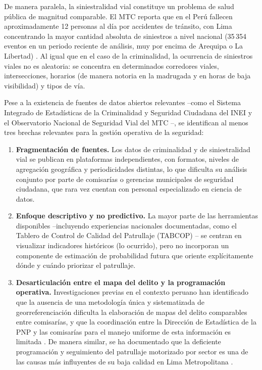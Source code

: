 \documentclass[12pt,letterpaper]{report}
\begin{document}
De manera paralela, la siniestralidad vial constituye un problema de salud p\'ublica de magnitud comparable. El MTC reporta que en el Per\'u fallecen aproximadamente 12 personas al d\'ia por accidentes de tr\'ansito, con Lima concentrando la mayor cantidad absoluta de siniestros a nivel nacional (35\,354 eventos en un periodo reciente de an\'alisis, muy por encima de Arequipa o La Libertad) \citep{mtc2024observatorio}. Al igual que en el caso de la criminalidad, la ocurrencia de siniestros viales no es aleatoria: se concentra en determinados corredores viales, intersecciones, horarios (de manera notoria en la madrugada y en horas de baja visibilidad) y tipos de v\'ia.

Pese a la existencia de fuentes de datos abiertos relevantes --como el Sistema Integrado de Estad\'isticas de la Criminalidad y Seguridad Ciudadana del INEI \citep{inei2022sistema} y el Observatorio Nacional de Seguridad Vial del MTC \citep{mtc2024observatorio}--, se identifican al menos tres brechas relevantes para la gesti\'on operativa de la seguridad:

\begin{enumerate}
    \item \textbf{Fragmentaci\'on de fuentes.} Los datos de criminalidad y de siniestralidad vial se publican en plataformas independientes, con formatos, niveles de agregaci\'on geogr\'afica y periodicidades distintas, lo que dificulta su an\'alisis conjunto por parte de comisar\'ias o gerencias municipales de seguridad ciudadana, que rara vez cuentan con personal especializado en ciencia de datos.
    \item \textbf{Enfoque descriptivo y no predictivo.} La mayor parte de las herramientas disponibles --incluyendo experiencias nacionales documentadas, como el Tablero de Control de Calidad del Patrullaje (TABCOP) \citep{sanchezguevara2022tabcop}-- se centran en visualizar indicadores hist\'oricos (lo ocurrido), pero no incorporan un componente de estimaci\'on de probabilidad futura que oriente expl\'icitamente d\'onde y cu\'ando priorizar el patrullaje.
    \item \textbf{Desarticulaci\'on entre el mapa del delito y la programaci\'on operativa.} Investigaciones previas en el contexto peruano han identificado que la ausencia de una metodolog\'ia \'unica y sistematizada de georreferenciaci\'on dificulta la elaboraci\'on de mapas del delito comparables entre comisar\'ias, y que la coordinaci\'on entre la Direcci\'on de Estad\'istica de la PNP y las comisar\'ias para el manejo uniforme de esta informaci\'on es limitada \citep{mora2015sistematizacion}. De manera similar, se ha documentado que la deficiente programaci\'on y seguimiento del patrullaje motorizado por sector es una de las causas m\'as influyentes de su baja calidad en Lima Metropolitana \citep{sanchezguevara2022tabcop}.
\end{enumerate}
\end{document}
